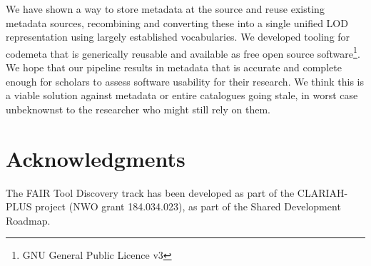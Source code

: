 \documentclass[a4paper,11pt]{article}
\begin{document}
We have shown a way to store metadata at the source and reuse existing metadata
sources, recombining and converting these into a single unified LOD
representation using largely established vocabularies. We developed tooling for
codemeta that is generically reusable and available as free open source
software\footnote{GNU General Public Licence v3}. We hope that our pipeline
results in metadata that is accurate and complete enough for scholars to assess
software usability for their research. We think this is a viable solution
against metadata or entire catalogues going stale, in worst
case unbeknownst to the researcher who might still rely on them.

\section*{Acknowledgments}

The FAIR Tool Discovery track has been developed as part of the CLARIAH-PLUS
project (NWO grant 184.034.023), as part of the Shared Development Roadmap.

\printbibliography
\end{document}
